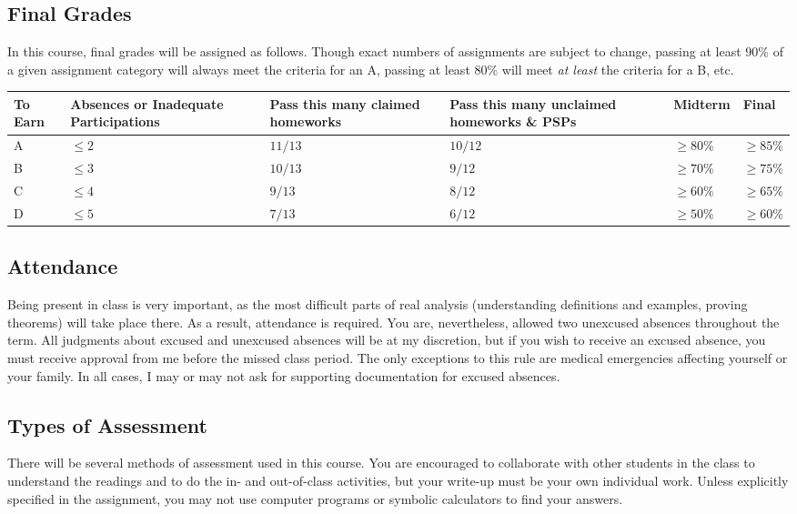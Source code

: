 \documentclass[11pt, a4paper]{article}
\begin{document}
\subsection*{Final Grades}
\label{specs-table}
In this course, final grades will be assigned as follows. Though exact numbers of assignments are subject to change, passing at least $90\%$ of a given assignment category will always meet the criteria for an A, passing at least $80\%$ will meet \textit{at least} the criteria for a B, etc.

\begin{center}
	\begin{tabular}{| p{0.75cm} | p{3cm} | p{3cm} | p{3cm} | p{1.5cm} | p{1.5cm} |}
	\hline
	\textbf{To Earn} & \textbf{Absences or Inadequate Participations} & \textbf{Pass this many claimed homeworks} & \textbf{Pass this many unclaimed homeworks \& PSPs} & \textbf{Midterm} & \textbf{Final} \\ \hline
	A & $\leq 2$ & $11/13$ & $10/12$ & $\geq 80\%$ & $\geq 85\%$ \\ \hline
	B & $\leq 3$ & $10/13$ & $9/12$ & $\geq 70\%$ & $\geq 75\%$ \\ \hline
	C & $\leq 4$ & $9/13$ & $8/12$ & $\geq 60\%$ & $\geq 65\%$ \\ \hline
	D & $\leq 5$ & $7/13$ & $6/12$ & $\geq 50\%$ & $\geq 60\%$ \\ \hline
	\end{tabular}
\end{center}

\subsection*{Attendance} Being present in class is very important, as the most difficult parts of real analysis (understanding definitions and examples, proving theorems) will take place there. As a result, attendance is required. You are, nevertheless, allowed two unexcused absences throughout the term. All judgments about excused and unexcused absences will be at my discretion, but if you wish to receive an excused absence, you must receive approval from me before the missed class period. The only exceptions to this rule are medical emergencies affecting yourself or your family. In all cases, I may or may not ask for supporting documentation for excused absences. 

\subsection*{Types of Assessment} There will be several methods of assessment used in this course. You are encouraged to collaborate with other students in the class to understand the readings and to do the in- and out-of-class activities, but your write-up must be your own individual work. Unless explicitly specified in the assignment, you may not use computer programs or symbolic calculators to find your answers.
\end{document}
